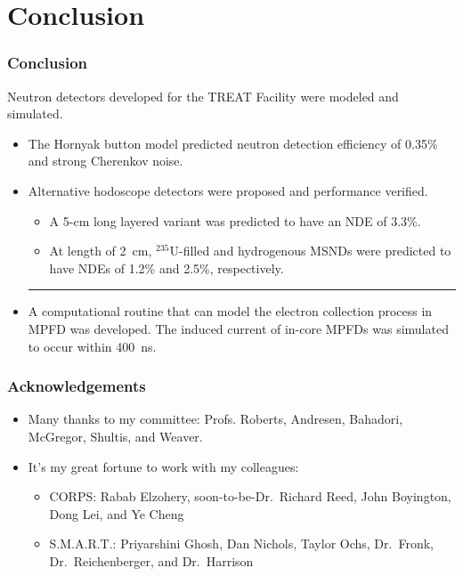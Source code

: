 \documentclass[fleqn]{beamer}
\begin{document}
\section{Conclusion}
\begin{frame}
 \frametitle{Conclusion}
 Neutron detectors developed for the TREAT Facility were modeled and simulated. 
 \begin{itemize}
   \item The Hornyak button model predicted neutron detection efficiency of 0.35\% and strong Cherenkov noise.
   \item Alternative hodoscope detectors were proposed and performance verified.
   \begin{itemize}
    \item A 5-cm long layered variant was predicted to have an NDE of 3.3\%.
    \item At length of 2~cm, $^{235}$U-filled and hydrogenous MSNDs were predicted to have NDEs of 1.2\% and 2.5\%, respectively.
   \end{itemize}
   
   \rule{.9\textwidth}{.2pt}
   \item A computational routine that can model the electron collection process in MPFD was developed. The induced current of in-core MPFDs was simulated to occur within 400~ns.
 \end{itemize}
\end{frame}

\begin{frame}
 \frametitle{Acknowledgements}
 \begin{itemize}
  \item Many thanks to my committee: Profs. Roberts, Andresen, Bahadori, McGregor, Shultis, and Weaver.
  \item It's my great fortune to work with my colleagues:
  \begin{itemize}
   \item CORPS: Rabab Elzohery, soon-to-be-Dr.~Richard Reed, John Boyington, Dong Lei, and Ye Cheng
   \item S.M.A.R.T.: Priyarshini Ghosh, Dan Nichols, Taylor Ochs, Dr.~Fronk,  Dr.~Reichenberger, and Dr.~Harrison
  \end{itemize}

 \end{itemize}

 
 
\end{frame}


\end{document}
